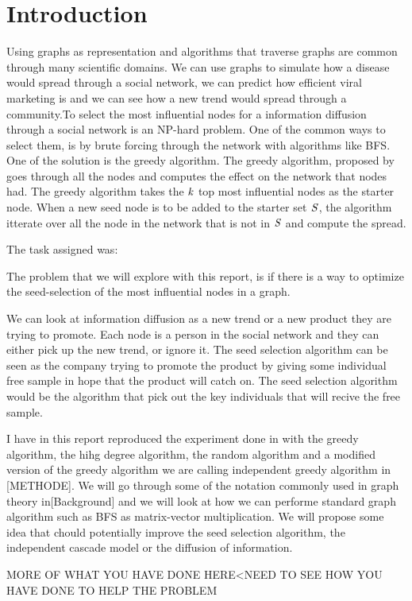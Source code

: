 \chapter{Introduction} 

Using graphs as representation and algorithms that traverse graphs are common through many scientific domains\cite{HybridBFS2015}. We can use graphs to simulate how a disease would spread through a social network, we can predict how efficient viral marketing is and we can see how a new trend would spread through a community\cite{MaximizeSpread2003}.To select the most influential nodes for a information diffusion through a social network is an NP-hard problem\cite{MaximizeSpread2003}. One of the common ways to select them, is by brute forcing through the network with algorithms like BFS. One of the solution is the greedy algorithm\cite{MaximizeSpread2015}. The greedy algorithm, proposed by\cite{MaximizeSpread2003} goes through all the nodes and computes the effect on the network that nodes had. The greedy algorithm takes the $\it{k}$ top most influential nodes as the starter node. When a new seed node is to be added to the starter set $\it{S}$, the algorithm itterate over all the node in the network that is not in $\it{S}$ and compute the spread.


The task assigned was:

The problem that we will explore with this report, is if there is a way to optimize the seed-selection of the most influential nodes in a graph.



We can look at information diffusion as a new trend or a new product they are trying to promote. Each node is a person in the social network and they can either pick up the new trend, or ignore it. The seed selection algorithm can be seen as the company trying to promote the product by giving some individual free sample in hope that the product will catch on. The seed selection algorithm would be the algorithm that pick out the key individuals that will recive the free sample.

I have in this report reproduced the experiment done in \cite{Maximizespread2003} with the greedy algorithm, the hihg degree algorithm, the random algorithm and a modified version of the greedy algorithm we are calling independent greedy algorithm in [METHODE]. We will go through some of the notation commonly used in graph theory in[Background] and we will look at how we can performe standard graph algorithm such as BFS as matrix-vector multiplication. We will propose some idea that chould potentially improve the seed selection algorithm, the independent cascade model or the diffusion of information. 

MORE OF WHAT YOU HAVE DONE HERE<NEED TO SEE HOW YOU HAVE DONE TO HELP THE PROBLEM
